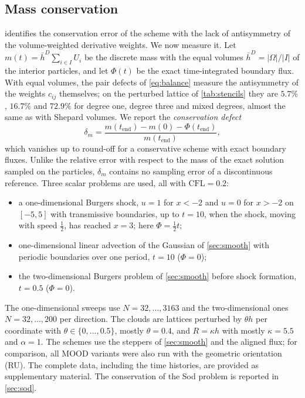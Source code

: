 \documentclass[11pt,a4paper]{article}
\numberwithin{equation}{section}
\newcommand{\CFL}{\mathrm{CFL}}
\begin{document}
\subsection{Mass conservation}\label{sec:mass}

 identifies the conservation error of the scheme with the lack of antisymmetry of the volume-weighted derivative weights. We now measure it. Let $m(t)=\bar h^D\sum_{i\in I}U_i$ be the discrete mass with the equal volumes $\bar h^D=|\Omega|/|I|$ of the interior particles,  and let $\Phi(t)$ be the exact time-integrated boundary flux. With equal volumes, the pair defects of \eqref{eq:balance} measure the antisymmetry of the weights $c_{ij}$ themselves; on the perturbed lattice of \cref{tab:stencils} they are $5.7\%$, $16.7\%$ and $72.9\%$ for degree one, degree three and mixed degrees, almost the same as with Shepard volumes. We report the \emph{conservation defect}
\begin{equation}\label{eq:defect}
\delta_m = \frac{m(t_{\mathrm{end}})-m(0)-\Phi(t_{\mathrm{end}})}{m(t_{\mathrm{end}})},
\end{equation}
which vanishes up to round-off for a conservative scheme with exact boundary fluxes. Unlike the relative error with respect to the mass of the exact solution sampled on the particles, $\delta_m$ contains no sampling error of a discontinuous reference. Three scalar problems are used, all with $\CFL=0.2$:
\begin{itemize}
\item a one-dimensional Burgers shock, $u=1$ for $x<-2$ and $u=0$ for $x>-2$ on $[-5,5]$ with transmissive boundaries, up to $t=10$, when the shock, moving with speed $\tfrac12$, has reached $x=3$; here $\Phi=\tfrac12t$;
\item one-dimensional linear advection of the Gaussian of \cref{sec:smooth} with periodic boundaries over one period, $t=10$ ($\Phi=0$);
\item the two-dimensional Burgers problem of \cref{sec:smooth} before shock formation, $t=0.5$ ($\Phi=0$).
\end{itemize}
The one-dimensional sweeps use $N=32,\dots,3163$ and the two-dimensional ones $N=32,\dots,200$ per direction. The clouds are lattices perturbed by $\theta h$ per coordinate with $\theta\in\{0,\dots,0.5\}$, mostly $\theta=0.4$, and $R=\kappa h$ with mostly $\kappa=5.5$ and $\alpha=1$. The schemes use the steppers of \cref{sec:smooth} and the aligned flux; for comparison, all MOOD variants were also run with the geometric orientation (RU). The complete data, including the time histories, are provided as supplementary material. The conservation of the Sod problem is reported in \cref{sec:sod}.
\end{document}
